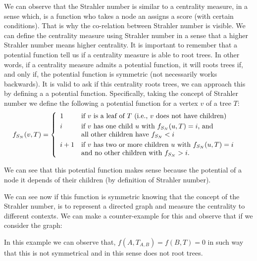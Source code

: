 
We can observe that the Strahler number is similar to a centrality measure, in a sense which, is a function who takes a node an assigns a score (with certain conditions). That is why the co-relation between Strahler number is visible. We can define the centrality measure using Strahler number in a sense that a higher Strahler number means higher centrality. It is important to remember that a potential function tell us if a centrality measure is able to root trees. In other words, if a centrality measure admits a potential function, it will roots trees if, and only if, the potential function is symmetric (not necessarily works backwards). It is valid to ask if this centrality roots trees, we can approach this by defining a a potential function. Specifically, taking the concept of Strahler number we define the following a potential function for a vertex $v$ of a tree $T$:
    \begin{equation*}
        f_{S_{N}} (v,T) = \left\{ \begin{array}{llc}
             1 &   \text{if $v$ is a leaf of $T$ (i.e., $v$ does not have children)}  & \smallskip \\ 
              i & \text{if $v$ has one child $u$ with $f_{S_{N}}(u, T) = i$, and} \\
              	& \text{all other children have  $f_{S_{N}} < i$} \smallskip \\
              i + 1 &  \text{if $v$ has two or more children $u$ with $f_{S_{N}}(u, T) = i$} \\
              & \text{and no other children with $f_{S_{N}} > i$.} \\
             \end{array}
   \right.
    \end{equation*}
    
We can see that this potential function makes sense because the potential of a node it depends of their children (by definition of Strahler number).

We can see now if this function is symmetric knowing that the concept of the Strahler number, is to represent a directed graph and measure the centrality to different contexts. We can make a counter-example for this and observe that if we consider the graph:
\begin{center}
\end{center}
In this example we can observe that, $f(A,T_{A,B}) =  f(B,T) = 0$ in such way that this is not symmetrical and in this sense does not root trees.

